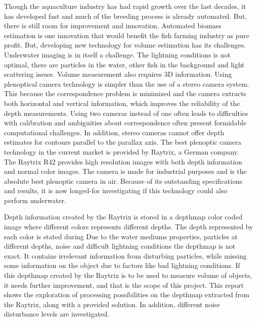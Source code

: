 Though the aquaculture industry has had rapid growth over the last decades, it has developed fast and much of the breeding process is already automated. But, there is still room for improvement and innovation. Automated biomass estimation is one innovation that would benefit the fish farming industry as pure profit.
But, developing new technology for volume estimation has its challenges.
Underwater imaging is in itself a challenge. The lightning conditions is not optimal, there are particles in the water, other fish in the background and light scattering issues. Volume measurement also requires 3D information. 
Using plenoptical camera technology is simpler than the use of a stereo camera system. This because the correspondence problem is minimized and the camera extracts both horizontal and vertical information, which improves the reliability of the depth measurements. Using two cameras instead of one often leads to difficulties with calibration and ambiguities about correspondence often present formidable computational challenges. In addition, stereo cameras cannot offer depth estimates for contours parallel to the parallax axis.\cite{article:stereo_vs_plenoptic}
The best plenoptic camera technology in the current market is provided by Raytrix, a German company.\cite{article:plenoptic_camera} The Raytrix R42 provides high resolution images with both depth information and normal color images. The camera is made for industrial purposes and is the absolute best plenoptic camera in air. Because of its outstanding specifications and results, it is now longed-for investigating if this technology could also perform underwater. 

Depth information created by the Raytrix is stored in a depthmap color coded image where different colors represents different depths. The depth represented by each color is stated during Due to the water mediums properties, particles at different depths, noise and difficult lightning conditions the depthmap is not exact. It contains irrelevant information from disturbing particles, while missing some information on the object due to factors like bad lightning conditions. 
If this depthmap created by the Raytrix is to be used to measure volume of objects, it needs further improvement, and that is the scope of this project. 
This report shows the exploration of processing possibilities on the depthmap extracted from the Raytrix, along with a provided solution. In addition, different noise disturbance levels are investigated.




